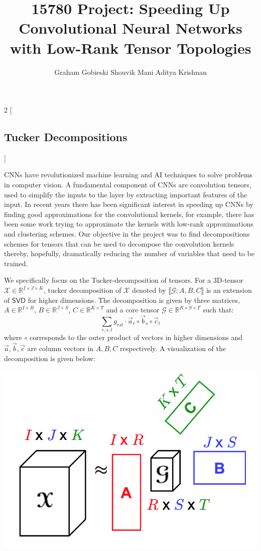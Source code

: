 \documentclass[a4paper]{article}
\title{\vspace{-3em} 15780 Project: Speeding Up Convolutional Neural Networks with Low-Rank Tensor Topologies}
\author{Graham Gobieski \quad  Shouvik Mani \quad  Aditya Krishnan}
\date{ \vspace{-3em}}
\newcommand{\R}{\mathbb{R}}
\begin{document}
\maketitle

\begin{multicols*}{2}
[
\subsection*{Tucker Decompositions}
]

CNNs have revolutionized machine learning and AI techniques to solve problems in computer vision. A fundamental component of CNNs are convolution tensors, used to simplify the inputs to the layer by extracting important features of the input. In recent years there has been significant interest in speeding up CNNs by finding good approximations for the convolutional kernels, for example, there has been some work trying to approximate the kernels with low-rank approximations and clustering schemes. Our objective in the project was to find decompositions schemes for tensors that can be used to decompose the convolution kernels thereby, hopefully, dramatically reducing the number of variables that need to be trained. 

We specifically focus on the Tucker-decomposition of tensors. For a 3D-tensor $\mathcal{X} \in \R^{I \times J \times K}$, tucker decomposition of $\mathcal{X}$ denoted by $\llbracket \mathcal{G}; A, B, C \rrbracket$ is an extension of $\mathsf{SVD}$ for higher dimensions. The decomposition is given by three matrices, $A \in \R^{I \times R}$, $B \in \R^{J \times S}$, $C \in \R^{K \times T}$ and a core tensor $\mathcal{G} \in \R^{R \times S \times T}$ such that: 
$$ \sum_{r, s , t} g_{rst} \cdot \vec{a}_r \circ \vec{b}_s \circ \vec{c}_t  $$
where $\circ$ corresponds to the outer product of vectors in higher dimensions and $\vec{a}, \vec{b}, \vec{c}$ are column vectors in $A, B, C$ respectively. A visualization of the decomposition is given below: 
\begin{center}
\includegraphics[scale=0.3]{tucker}
\end{center}


\end{multicols*}
\end{document}
